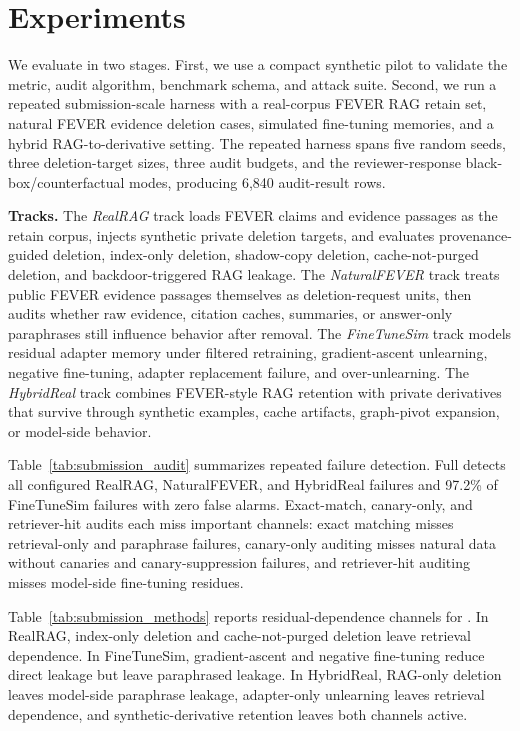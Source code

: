 \section{Experiments}

We evaluate \method{} in two stages. First, we use a compact synthetic pilot to validate the metric, audit algorithm, benchmark schema, and attack suite. Second, we run a repeated submission-scale harness with a real-corpus FEVER RAG retain set, natural FEVER evidence deletion cases, simulated fine-tuning memories, and a hybrid RAG-to-derivative setting. The repeated harness spans five random seeds, three deletion-target sizes, three audit budgets, and the reviewer-response black-box/counterfactual modes, producing 6,840 audit-result rows.

\textbf{Tracks.}
The \emph{RealRAG} track loads FEVER claims and evidence passages as the retain corpus, injects synthetic private deletion targets, and evaluates provenance-guided deletion, index-only deletion, shadow-copy deletion, cache-not-purged deletion, and backdoor-triggered RAG leakage. The \emph{NaturalFEVER} track treats public FEVER evidence passages themselves as deletion-request units, then audits whether raw evidence, citation caches, summaries, or answer-only paraphrases still influence behavior after removal. The \emph{FineTuneSim} track models residual adapter memory under filtered retraining, gradient-ascent unlearning, negative fine-tuning, adapter replacement failure, and over-unlearning. The \emph{HybridReal} track combines FEVER-style RAG retention with private derivatives that survive through synthetic examples, cache artifacts, graph-pivot expansion, or model-side behavior.



Table~\ref{tab:submission_audit} summarizes repeated failure detection. Full \method{} detects all configured RealRAG, NaturalFEVER, and HybridReal failures and 97.2\% of FineTuneSim failures with zero false alarms. Exact-match, canary-only, and retriever-hit audits each miss important channels: exact matching misses retrieval-only and paraphrase failures, canary-only auditing misses natural data without canaries and canary-suppression failures, and retriever-hit auditing misses model-side fine-tuning residues.



Table~\ref{tab:submission_methods} reports residual-dependence channels for \method{}. In RealRAG, index-only deletion and cache-not-purged deletion leave retrieval dependence. In FineTuneSim, gradient-ascent and negative fine-tuning reduce direct leakage but leave paraphrased leakage. In HybridReal, RAG-only deletion leaves model-side paraphrase leakage, adapter-only unlearning leaves retrieval dependence, and synthetic-derivative retention leaves both channels active.

